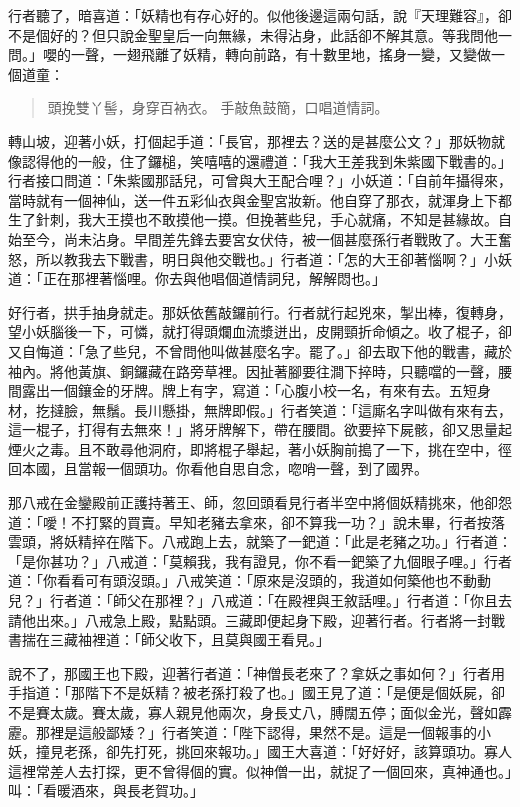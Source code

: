 行者聽了，暗喜道：「妖精也有存心好的。似他後邊這兩句話，說『天理難容』，卻不是個好的？但只說金聖皇后一向無緣，未得沾身，此話卻不解其意。等我問他一問。」嚶的一聲，一翅飛離了妖精，轉向前路，有十數里地，搖身一變，又變做一個道童：
\begin{quote}
頭挽雙丫髻，身穿百衲衣。
手敲魚鼓簡，口唱道情詞。
\end{quote}

轉山坡，迎著小妖，打個起手道：「長官，那裡去？送的是甚麼公文？」那妖物就像認得他的一般，住了鑼槌，笑嘻嘻的還禮道：「我大王差我到朱紫國下戰書的。」行者接口問道：「朱紫國那話兒，可曾與大王配合哩？」小妖道：「自前年攝得來，當時就有一個神仙，送一件五彩仙衣與金聖宮妝新。他自穿了那衣，就渾身上下都生了針刺，我大王摸也不敢摸他一摸。但挽著些兒，手心就痛，不知是甚緣故。自始至今，尚未沾身。早間差先鋒去要宮女伏侍，被一個甚麼孫行者戰敗了。大王奮怒，所以教我去下戰書，明日與他交戰也。」行者道：「怎的大王卻著惱啊？」小妖道：「正在那裡著惱哩。你去與他唱個道情詞兒，解解悶也。」

好行者，拱手抽身就走。那妖依舊敲鑼前行。行者就行起兇來，掣出棒，復轉身，望小妖腦後一下，可憐，就打得頭爛血流漿迸出，皮開頸折命傾之。收了棍子，卻又自悔道：「急了些兒，不曾問他叫做甚麼名字。罷了。」卻去取下他的戰書，藏於袖內。將他黃旗、銅鑼藏在路旁草裡。因扯著腳要往澗下捽時，只聽噹的一聲，腰間露出一個鑲金的牙牌。牌上有字，寫道：「心腹小校一名，有來有去。五短身材，扢撻臉，無鬚。長川懸掛，無牌即假。」行者笑道：「這廝名字叫做有來有去，這一棍子，打得有去無來！」將牙牌解下，帶在腰間。欲要捽下屍骸，卻又思量起煙火之毒。且不敢尋他洞府，即將棍子舉起，著小妖胸前搗了一下，挑在空中，徑回本國，且當報一個頭功。你看他自思自念，唿哨一聲，到了國界。

那八戒在金鑾殿前正護持著王、師，忽回頭看見行者半空中將個妖精挑來，他卻怨道：「噯！不打緊的買賣。早知老豬去拿來，卻不算我一功？」說未畢，行者按落雲頭，將妖精捽在階下。八戒跑上去，就築了一鈀道：「此是老豬之功。」行者道：「是你甚功？」八戒道：「莫賴我，我有證見，你不看一鈀築了九個眼子哩。」行者道：「你看看可有頭沒頭。」八戒笑道：「原來是沒頭的，我道如何築他也不動動兒？」行者道：「師父在那裡？」八戒道：「在殿裡與王敘話哩。」行者道：「你且去請他出來。」八戒急上殿，點點頭。三藏即便起身下殿，迎著行者。行者將一封戰書揣在三藏袖裡道：「師父收下，且莫與國王看見。」

說不了，那國王也下殿，迎著行者道：「神僧長老來了？拿妖之事如何？」行者用手指道：「那階下不是妖精？被老孫打殺了也。」國王見了道：「是便是個妖屍，卻不是賽太歲。賽太歲，寡人親見他兩次，身長丈八，膊闊五停；面似金光，聲如霹靂。那裡是這般鄙矮？」行者笑道：「陛下認得，果然不是。這是一個報事的小妖，撞見老孫，卻先打死，挑回來報功。」國王大喜道：「好好好，該算頭功。寡人這裡常差人去打探，更不曾得個的實。似神僧一出，就捉了一個回來，真神通也。」叫：「看暖酒來，與長老賀功。」

